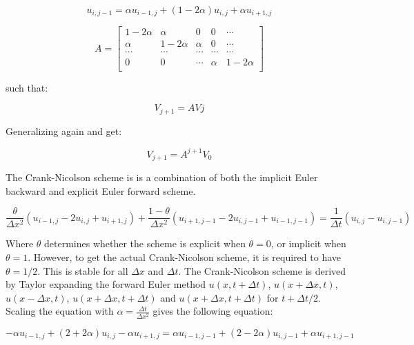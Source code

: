 \documentclass[10pt,a4paper]{article}
\begin{document}
\begin{equation}
u_{i,j-1} = \alpha u_{i-1,j} + (1 - 2\alpha)u_{i,j} + \alpha u_{i+1,j}
\end{equation}

\begin{equation}
A = \begin{bmatrix}
1 - 2\alpha & \alpha & 0 & 0 &\cdots\\
\alpha & 1 - 2\alpha & \alpha & 0 & \cdots\\
\cdots & \cdots & \cdots & \cdots & \cdots\\
0 & 0 & \cdots & \alpha & 1 - 2\alpha\\

\end{bmatrix}
\end{equation}

\noindent such that:

\begin{equation}
V_{j+1} = AVj
\end{equation}

\noindent Generalizing again and get:

\begin{equation}
V_{j+1}= A^{j+1}V_{0}
\end{equation}

\noindent The Crank-Nicolson scheme is is a combination of both the implicit Euler backward and explicit Euler forward scheme.

\begin{equation}
\frac{\theta}{\Delta x^2}(u_{i-1,j} - 2u_{i,j} + u_{i+1,j}) + \frac{1 - \theta}{\Delta x^2}(u_{i+1,j-1} - 2u_{i,j-1} + u_{i-1,j-1}) = \frac{1}{\Delta t}(u_{i,j} - u_{i,j-1})
\end{equation}

\noindent Where $\theta$ determines whether the scheme is explicit when $\theta = 0$, or implicit when $\theta = 1$. However, to get the actual Crank-Nicolson scheme, it is required to have $\theta = 1/2$. This is stable for all $\Delta x$ and $\Delta t$. The Crank-Nicolson scheme is derived by Taylor expanding the forward Euler method $u(x,t + \Delta t)$, $u(x + \Delta x,t)$, $u(x - \Delta x,t)$, $u(x + \Delta x, t + \Delta t)$ and $u(x + \Delta x, t + \Delta t)$ for $t + \Delta t/2$.\\

\noindent Scaling the equation with $\alpha = \frac{\Delta t}{\Delta x^2}$ gives the following equation:

\begin{equation}
-\alpha u_{i-1,j} + (2 + 2\alpha)u_{i,j} -\alpha u_{i+1,j} = \alpha u_{i-1,j-1} + (2-2\alpha)u_{i,j-1} + \alpha u_{i+1,j-1}
\end{equation}
\end{document}

